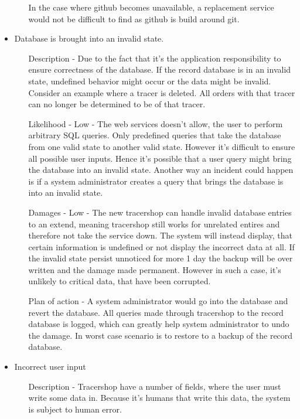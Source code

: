 \documentclass{article}
\begin{document}
\begin{itemize}
\begin{itemize}
    In the case where github becomes unavailable, a replacement service would not be difficult to find as github is build around \Gls{git}.
  \end{itemize}
  \item Database is brought into an invalid state.
  \begin{itemize}
    \item[Description] - Due to the fact that it's the application responsibility to ensure correctness of the database.
    If the record database is in an invalid state, undefined behavior might occur or the data might be invalid.\\
    Consider an example where a tracer is deleted. All orders with that tracer can no longer be determined to be of that tracer.
    \item[Likelihood] - Low - The web services doesn't allow, the user to perform arbitrary SQL queries.
    Only predefined queries that take the database from one valid state to another valid state. However it's difficult to ensure all possible user inputs.
    Hence it's possible that a user query might bring the database into an invalid state.
    Another way an incident could happen is if a system administrator creates a query that brings the database is into an invalid state.
    \item[Damages] - Low - The new tracershop can handle invalid database entries to an extend, meaning tracershop still works for unrelated entires and therefore not take the service down.
    The system will instead display, that certain information is undefined or not display the incorrect data at all. If the invalid state persist unnoticed for more 1 day the backup will be over written and the damage made permanent. However in such a case, it's unlikely to critical data, that have been corrupted.
    \item[Plan of action] - A system administrator would go into the database and revert the database. All queries made through tracershop to the record database is logged, which can greatly help system administrator to undo the damage.
    In worst case scenario is to restore to a backup of the record database.
  \end{itemize}
  \item Incorrect user input
  \begin{itemize}
    \item[Description] - Tracershop have a number of fields, where the user must write some data in. Because it's humans that write this data, the system is subject to human error.

\end{itemize}
\end{itemize}
\end{document}
